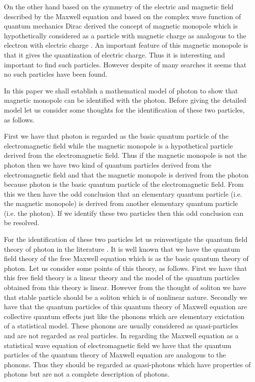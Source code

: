 \documentclass[a4paper,a4paper]{article}
\begin{document}
On the other hand based on the symmetry of the electric and magnetic field described by the Maxwell equation and based on the complex wave function of quantum mechanics  Dirac derived the concept of magnetic monopole which  is hypothetically considered as a particle with magnetic charge as analogous to the electron with electric charge \cite{Dir}\cite{Dir2}. An important feature of this magnetic monopole is that it gives the quantization of electric charge. Thus it is interesting and important to find such particles. However despite of many searches it seems that no such particles have been found. 

In this paper we shall establish a mathematical model of photon to show that magnetic monopole can be identified with the photon. Before giving the detailed model let us consider some thoughts for the identification of these two particles, as follows.

First we have that photon is regarded as the basic quantum particle of the electromagnetic field while the magnetic monopole is a hypothetical particle  derived from the electromagnetic field. Thus if the magnetic monopole is not the photon then we have two kind of quantum particles derived from the electromagnetic field and that the magnetic monopole is derived from the photon because photon is the basic quantum particle of the electromagnetic field.
From this we then have the odd conclusion that an elementary quantum particle (i.e. the magnetic monopole) is derived from another elementary quantum particle (i.e. the photon). If we identify these two particles then this odd conclusion can be resolved.

For the identification of these two particles let us reinvestigate the quantum field theory of photon in the literature \cite{Zub}. It is well known that we have the quantum field theory of the free Maxwell equation which is as the basic quantum theory of photon. 
Let us consider some points of this theory, as follows. 
First we have that this  free field theory is a linear theory and the model of the quantum particles obtained from this theory is linear. However from the thought of soliton we have that stable particle should be a soliton which is of nonlinear nature. 
Secondly we have that  the quantum particles of  this  quantum theory of Maxwell equation are collective quantum effects just like the phonons which are elementary exictation of a statistical model. These phonons are usually considered as quasi-particles and are not regarded as real particles. In regarding the Maxwell equation as a statistical wave equation of electromagnetic field  we have that the quantum particles of the quantum  theory of Maxwell equation are analogous to the phonons. Thus they should be regarded as quasi-photons which have properties of photons but are not a complete description of photons. 
\end{document}
